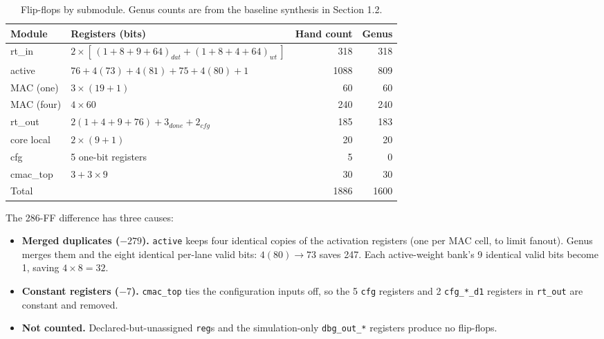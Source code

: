 \begin{table}[H]
\centering
\small
\begin{tabular}{llrr}
\toprule
Module & Registers (bits) & Hand count & Genus \\
\midrule
rt\_in     & $2 \times [\,(1+8+9+64)_{dat} + (1+8+4+64)_{wt}\,]$ & 318  & 318 \\
active     & $76 + 4(73) + 4(81) + 75 + 4(80) + 1$             & 1088 & 809 \\
MAC (one)  & $3 \times (19 + 1)$                               & 60   & 60  \\
MAC (four) & $4 \times 60$                                     & 240  & 240 \\
rt\_out    & $2(1+4+9+76) + 3_{done} + 2_{cfg}$                & 185  & 183 \\
core local & $2 \times (9+1)$                                  & 20   & 20  \\
cfg        & 5 one-bit registers                               & 5    & 0   \\
cmac\_top  & $3 + 3 \times 9$                                  & 30   & 30  \\
\midrule
Total      &                                                   & 1886 & 1600 \\
\bottomrule
\end{tabular}
\caption{Flip-flops by submodule. Genus counts are from the baseline synthesis in Section 1.2.}
\label{tab:ff}
\end{table}

The 286-FF difference has three causes:
\begin{itemize}
  \item \textbf{Merged duplicates ($-279$).} \texttt{active} keeps four identical copies of the
        activation registers (one per MAC cell, to limit fanout). Genus merges them and the
        eight identical per-lane valid bits: $4(80) \rightarrow 73$ saves 247. Each active-weight
        bank's 9 identical valid bits become 1, saving $4 \times 8 = 32$.
  \item \textbf{Constant registers ($-7$).} \texttt{cmac\_top} ties the configuration inputs off,
        so the 5 \texttt{cfg} registers and 2 \texttt{cfg\_*\_d1} registers in \texttt{rt\_out}
        are constant and removed.
  \item \textbf{Not counted.} Declared-but-unassigned \texttt{reg}s and the simulation-only
        \texttt{dbg\_out\_*} registers produce no flip-flops.
\end{itemize}

